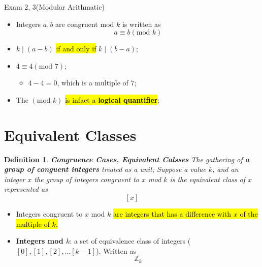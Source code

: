 \documentclass{note}
\newtheorem{definition}{Definition}
\begin{document}
\begin{note}{Exam 2, 3(Modular Arithmatic)}
        \begin{itemize}
            \item Integers $ a, b $ are congruent mod $ k $ is written as 
            \begin{displaymath}
                a \equiv b \left(\text{mod } k\right)
            \end{displaymath}

            \item $ k \mid \left( a - b \right) $ \hl{if and only if} $ k \mid \left( b - a \right) $;
            \item $ 4 \equiv 4 \left(\text{mod } 7 \right) $;
            \begin{itemize}
                \item $ 4 - 4 = 0 $, which is a multiple of $ 7 $;
            \end{itemize}

            \item The $ \left(\text{mod } k\right) $ \hl{is infact a \textbf{logical quantifier}};
        \end{itemize}

        \section{Equivalent Classes}
        \begin{definition}
            \textbf{Congruence Cases, Equivalent Calsses} \textit{The gathering of \textbf{a group of conguent integers} treated
            as a unit}; Suppose a value $ k $, and an integer $ x $ the group of integers congruent to $ x $ mod $ k $ is 
            the equivalent class of $ x $ represented as 
            \begin{equation}
                \left[ x \right]
            \end{equation}
        \end{definition}

        \begin{itemize}
            \item Integers congruent to $ x $ mod $ k $ \hl{are integers that has a difference with $ x $ of the multiple of $ k $.}
            \item \textbf{Integers mod $ k $}: a set of equivalence class of integers ($ [0], [1], [2], ... [k - 1] $). Written as 
            \begin{equation}
                \mathbb{Z}_{k}
            \end{equation}
        \end{itemize}


\end{note}
\end{document}
